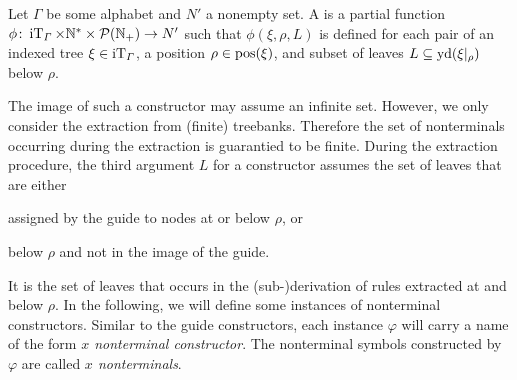 \documentclass[../../document.tex]{subfiles}
\begin{document}
    \begin{definition}
        Let \(\varGamma\) be some alphabet and \(N'\) a nonempty set.
        A  is a partial function \(\phi\colon \operatorname{iT}_\varGamma \times \mathbb{N}^* \times \mathcal{P}(\mathbb{N}_+) \to N'\) such that \(\phi(\xi, \rho, L)\) is defined for each pair of an indexed tree \(\xi \in \operatorname{iT}_\varGamma\), a position \(\rho \in \operatorname{pos}(\xi)\), and subset of leaves \(L \subseteq \operatorname{yd}(\xi|_\rho)\) below \(\rho\).
    \end{definition}


    The image of such a constructor may assume an infinite set.
    However, we only consider the extraction from (finite) treebanks.
    Therefore the set of nonterminals occurring during the extraction is guarantied to be finite.
    During the extraction procedure, the third argument \(L\) for a constructor assumes the set of leaves that are either
    \begin{inparaenum}
        \item assigned by the guide to nodes at or below \(\rho\), or
        \item below \(\rho\) and not in the image of the guide.
    \end{inparaenum}
    It is the set of leaves that occurs in the (sub-)derivation of rules extracted at and below \(\rho\).
    In the following, we will define some instances of nonterminal constructors.
    Similar to the guide constructors, each instance \(\varphi\) will carry a name of the form \emph{\(x\) nonterminal constructor}.
    The nonterminal symbols constructed by \(\varphi\) are called \emph{\(x\) nonterminals}.
\end{document}
